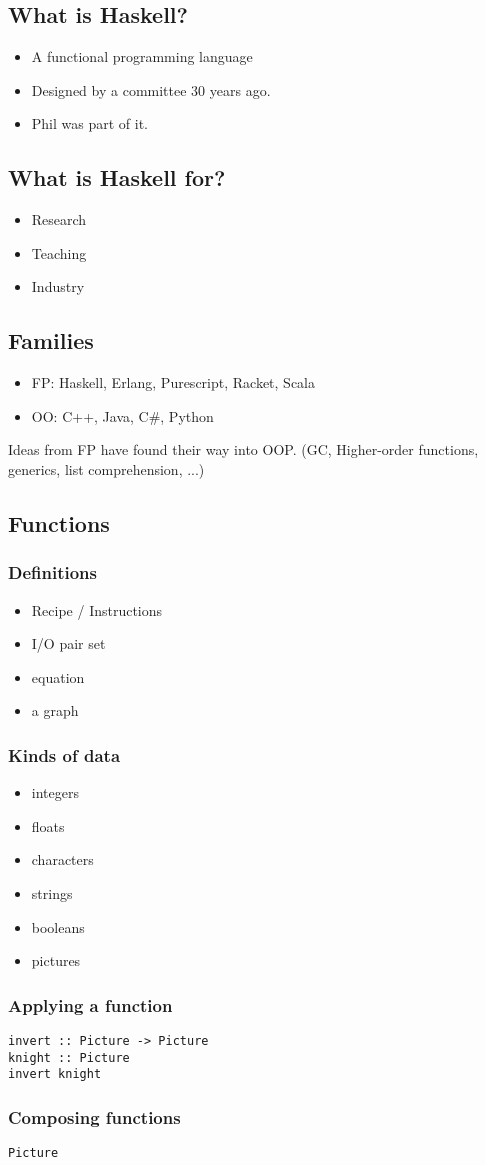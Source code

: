 \documentclass{article}
\begin{document}
\subsection{What is Haskell?}
\begin{itemize}
    \item A functional programming language
    \item Designed by a committee 30 years ago.
    \item Phil was part of it.
\end{itemize}
\subsection{What is Haskell for?}
\begin{itemize}
    \item Research
    \item Teaching
    \item Industry
\end{itemize}
\subsection{Families}
\begin{itemize}
    \item FP: Haskell, Erlang, Purescript, Racket, Scala
    \item OO: C++, Java, C\#, Python
\end{itemize}
Ideas from FP have found their way into OOP. (GC, Higher-order functions, generics, list comprehension, ...)
\subsection{Functions}
\subsubsection{Definitions}
\begin{itemize}
    \item Recipe / Instructions
    \item I/O pair set
    \item equation
    \item a graph
\end{itemize}
\subsubsection{Kinds of data}
\begin{itemize}
    \item integers
    \item floats
    \item characters
    \item strings
    \item booleans
    \item pictures
\end{itemize}
\subsubsection{Applying a function}
\begin{verbatim}
invert :: Picture -> Picture
knight :: Picture
invert knight
\end{verbatim}
\subsubsection{Composing functions}
\begin{verbatim}
Picture 
\end{verbatim}
\end{document}
